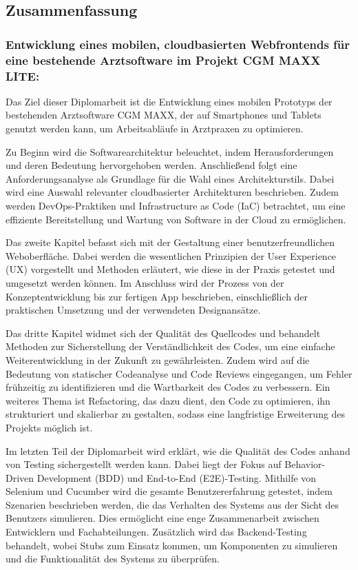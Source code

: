 \begin{flushleft}
	
	\subsection*{Zusammenfassung}

	\subsubsection*{Entwicklung eines mobilen, cloudbasierten Webfrontends für eine bestehende Arztsoftware im Projekt CGM MAXX LITE:}

    Das Ziel dieser Diplomarbeit ist die Entwicklung eines mobilen Prototyps der bestehenden Arztsoftware CGM MAXX, der auf Smartphones und Tablets genutzt werden kann, um Arbeitsabläufe in Arztpraxen zu optimieren.

    Zu Beginn wird die Softwarearchitektur beleuchtet, indem Herausforderungen und deren Bedeutung hervorgehoben werden. Anschließend folgt eine Anforderungsanalyse als Grundlage für die Wahl eines Architekturstils. Dabei wird eine Auswahl relevanter cloudbasierter Architekturen beschrieben.
    Zudem werden DevOps-Praktiken und Infrastructure as Code (IaC) betrachtet, um eine effiziente Bereitstellung und Wartung von Software in der Cloud zu ermöglichen.

    Das zweite Kapitel befasst sich mit der Gestaltung einer benutzerfreundlichen Weboberfläche. Dabei werden die wesentlichen Prinzipien der User Experience (UX) vorgestellt und Methoden erläutert, wie diese in der Praxis getestet und umgesetzt werden können. Im Anschluss wird der Prozess von der Konzeptentwicklung bis zur fertigen App beschrieben, einschließlich der praktischen Umsetzung und der verwendeten Designansätze.

    Das dritte Kapitel widmet sich der Qualität des Quellcodes und behandelt Methoden zur Sicherstellung der Verständlichkeit des Codes, um eine einfache Weiterentwicklung in der Zukunft zu gewährleisten. Zudem wird auf die Bedeutung von statischer Codeanalyse und Code Reviews eingegangen, um Fehler frühzeitig zu identifizieren und die Wartbarkeit des Codes zu verbessern.
    Ein weiteres Thema ist Refactoring, das dazu dient, den Code zu optimieren, ihn strukturiert und skalierbar zu gestalten, sodass eine
    langfristige Erweiterung des Projekts möglich ist.

   Im letzten Teil der Diplomarbeit wird erklärt, wie die Qualität des Codes anhand von Testing sichergestellt werden kann. Dabei liegt der Fokus auf Behavior-Driven Development (BDD) und End-to-End (E2E)-Testing. Mithilfe von Selenium und Cucumber wird die gesamte Benutzererfahrung getestet, indem Szenarien beschrieben werden, die das Verhalten des Systems aus der Sicht des Benutzers simulieren. Dies ermöglicht eine enge Zusammenarbeit zwischen Entwicklern und Fachabteilungen. Zusätzlich wird das Backend-Testing behandelt, wobei Stubs zum Einsatz kommen, um Komponenten zu simulieren und die Funktionalität des Systems zu überprüfen.

\end{flushleft}
